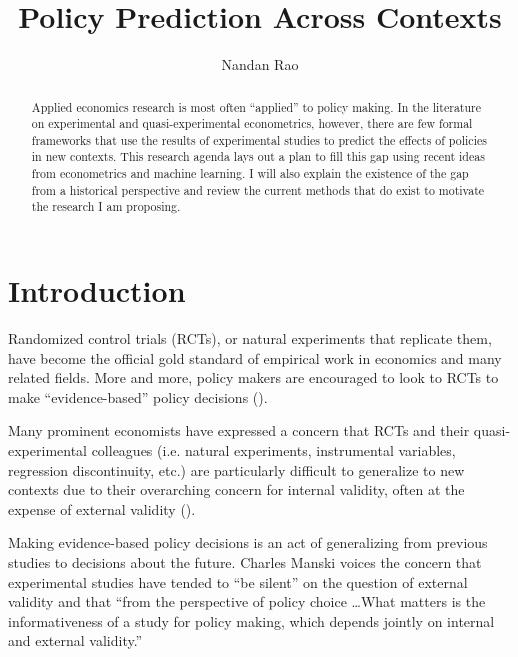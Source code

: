 \documentclass[a4paper,12pt]{article}
\title{ Policy Prediction Across Contexts  }
\author{Nandan Rao}
\begin{document}
\maketitle

\begin{abstract}
Applied economics research is most often ``applied'' to policy making. In the literature on experimental and quasi-experimental econometrics, however, there are few formal frameworks that use the results of experimental studies to predict the effects of policies in new contexts. This research agenda lays out a plan to fill this gap using recent ideas from econometrics and machine learning. I will also explain the existence of the gap from a historical perspective and review the current methods that do exist to motivate the research I am proposing.
\end{abstract}

\clearpage

\tableofcontents

\clearpage

\section{Introduction}

Randomized control trials (RCTs), or natural experiments that replicate them, have become the official gold standard of empirical work in economics and many related fields. More and more, policy makers are encouraged to look to RCTs to make ``evidence-based'' policy decisions (\cite{Manski2013, Cartwright2013}).

Many prominent economists have expressed a concern that RCTs and their quasi-experimental colleagues (i.e. natural experiments, instrumental variables, regression discontinuity, etc.) are particularly difficult to generalize to new contexts due to their overarching concern for internal validity, often at the expense of external validity (\cite{Heckman1995, Heckman2008, Deaton2010, Manski2013, Deaton2018}).

Making evidence-based policy decisions is an act of generalizing from previous studies to decisions about the future. Charles Manski \parencite*{Manski2013} voices the concern that experimental studies have tended to ``be silent'' on the question of external validity and that ``from the perspective of policy choice \ldots What matters is the informativeness of a study for policy making, which depends jointly on internal and external validity.''
\end{document}
